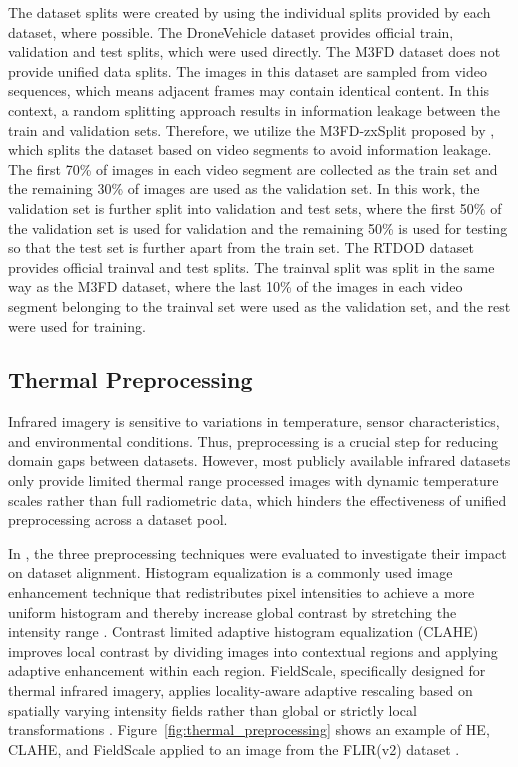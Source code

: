 \documentclass[12pt,oneside,bibtotoc,liststotoc]{scrbook}
\begin{document}
The dataset splits were created by using the individual splits
provided by each dataset, where possible. The DroneVehicle dataset
provides official train, validation and test splits, which were used
directly.
The M3FD dataset does not provide unified data splits.
The images in this dataset are sampled from video sequences,
which means adjacent frames may contain identical content.
In this context, a random splitting approach results in information leakage
between the train and validation sets. Therefore, we utilize the
M3FD-zxSplit proposed by \cite{zhang2024rethinkingEarlyFusion},
which splits the dataset based on video segments to avoid information leakage.
The first 70\% of images in each video segment are collected as the
train set and the remaining 30\% of images are used as the validation set.
In this work, the validation set is further split into validation and test
sets, where the first 50\% of the validation set is used for validation
and the remaining 50\% is used for testing so that the test set is
further apart from the train set.
The RTDOD dataset provides official trainval and test splits.
The trainval split was split in the same way as the M3FD dataset,
where the last 10\% of the images in each video segment belonging
to the trainval set were used as
the validation set, and the rest were used for training.

\vspace{-0.8em}
\subsection{Thermal Preprocessing}
\vspace{-0.2em}

Infrared imagery is sensitive to variations in temperature,
sensor characteristics, and environmental conditions. Thus,
preprocessing is a crucial step for reducing domain gaps between datasets.
However, most publicly available infrared datasets only provide limited
thermal range  processed images with dynamic temperature scales rather
than full radiometric data, which
hinders the effectiveness of unified preprocessing across a dataset pool.

In \cite{becker2025fusionOrConfusionDatasetPooling}, the three preprocessing
techniques were evaluated to investigate their
impact on dataset alignment.
Histogram equalization is a commonly used image enhancement technique
that redistributes pixel intensities to
achieve a more uniform histogram and thereby increase global contrast by
stretching the intensity range \cite{herrmann2018cnnInfraredPersonDetectionDomainAdaptation}.
Contrast limited adaptive histogram equalization
(CLAHE) \cite{pizer1987adaptiveHistogramEqualization} improves local contrast by dividing images into contextual regions
and applying adaptive enhancement within each region.
FieldScale, specifically designed for thermal infrared imagery,
applies locality-aware adaptive rescaling based on spatially varying
intensity fields rather than global or strictly local transformations \cite{gil2024fieldscale}.
Figure~\ref{fig:thermal_preprocessing} shows an example of HE, CLAHE,
and FieldScale applied to an image from the FLIR(v2) dataset \cite{teledyne_2022_flirAdasV2Dataset}.
\end{document}
